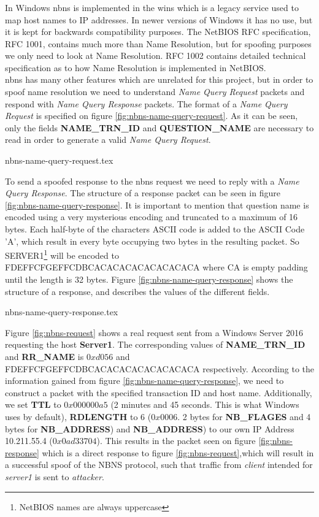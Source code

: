 \documentclass{article}
\begin{document}
\subsubsection{}
\label{sec:nbns}
In Windows \gls{nbns} is implemented in the \gls{wins} which is a legacy service used to map host names to IP addresses. In newer versions of Windows it has no use, but it is kept for backwards compatibility purposes. The NetBIOS RFC specification, RFC 1001\cite{url:rfc:netbios}, contains much more than Name Resolution, but for spoofing purposes we only need to look at Name Resolution.
RFC 1002\cite{url:rfc:netbios-technical} contains detailed technical specification as to how Name Resolution is implemented in NetBIOS.\\
\gls{nbns} has many other features which are unrelated for this project, but in order to spoof name resolution we need to understand \emph{Name Query Request} packets and respond with \emph{Name Query Response} packets. The format of a \emph{Name Query Request} is specified on figure \ref{fig:nbns-name-query-request}. As it can be seen, only the fields \textbf{NAME\_TRN\_ID} and \textbf{QUESTION\_NAME} are necessary to read in order to generate a valid \emph{Name Query Request}.

{nbns-name-query-request.tex}

To send a spoofed response to the \gls{nbns} request we need to reply with a \emph{Name Query Response}. The structure of a response packet can be seen in figure \ref{fig:nbns-name-query-response}. It is important to mention that question name is encoded using a very mysterious encoding and truncated to a maximum of 16 bytes. Each half-byte of the characters ASCII code is added to the ASCII Code 'A'\cite{url:nbns-name-encoding}, which result in every byte occupying two bytes in the resulting packet. So SERVER1\footnote{NetBIOS names are always uppercase} will be encoded to FDEFFCFGEFFCDBCACACACACACACACACA where CA is empty padding until the length is 32 bytes. Figure \ref{fig:nbns-name-query-response} shows the structure of a response, and describes the values of the different fields.

{nbns-name-query-response.tex}

Figure \ref{fig:nbns-request} shows a real request sent from a Windows Server 2016 requesting the host \textbf{Server1}. The corresponding values of \textbf{NAME\_TRN\_ID} and \textbf{RR\_NAME} is $0xd056$ and FDEFFCFGEFFCDBCACACACACACACACACA respectively. According to the information gained from figure \ref{fig:nbns-name-query-response}, we need to construct a packet with the specified transaction ID and host name. Additionally, we set \textbf{TTL} to $0x000000a5$ (2 minutes and 45 seconds. This is what Windows uses by default), \textbf{RDLENGTH} to 6 ($0x0006$. 2 bytes for \textbf{NB\_FLAGES} and 4 bytes for \textbf{NB\_ADDRESS}) and \textbf{NB\_ADDRESS}) to our own IP Address 10.211.55.4 ($0x0ad33704$). This results in the packet seen on figure \ref{fig:nbns-response} which is a direct response to figure \ref{fig:nbns-request},which will result in a successful spoof of the NBNS protocol, such that traffic from \emph{client} intended for \emph{server1} is sent to \emph{attacker}.
\end{document}
